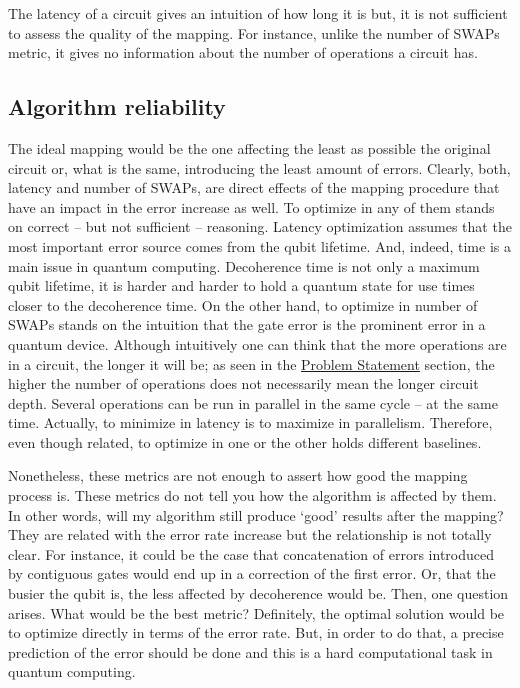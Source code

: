 The latency of a circuit gives an intuition of how long it is but, it is not sufficient to assess the quality of the mapping. For instance, unlike the number of SWAPs metric, it gives no information about the number of operations a circuit has.

\subsection{Algorithm reliability}
\label{sec:org4a19018}

The ideal mapping would be the one affecting the least as possible the original circuit or, what is the same, introducing the least amount of errors.
Clearly, both, latency and number of SWAPs, are direct effects of the mapping procedure that have an impact in the error increase as well.
To optimize in any of them stands on correct -- but not sufficient -- reasoning.
Latency optimization assumes that the most important error source comes from the qubit lifetime.
And, indeed, time is a main issue in quantum computing.
Decoherence time is not only a maximum qubit lifetime, it is harder and harder to hold a quantum state for use times closer to the decoherence time.
On the other hand, to optimize in number of SWAPs stands on the intuition that the gate error is the prominent error in a quantum device.
Although intuitively one can think that the more operations are in a circuit, the longer it will be; as seen in the \href{chapter-1.org}{Problem Statement} section, the higher the number of operations does not necessarily mean the longer circuit depth.
Several operations can be run in parallel in the same cycle -- at the same time.
Actually, to minimize in latency is to maximize in parallelism.
Therefore, even though related, to optimize in one or the other holds different baselines.

Nonetheless, these metrics are not enough to assert how good the mapping process is.
These metrics do not tell you how the algorithm is affected by them.
In other words, will my algorithm still produce `good' results after the mapping?
They are related with the error rate increase but the relationship is not totally clear.
For instance, it could be the case that concatenation of errors introduced by contiguous gates would end up in a correction of the first error.
Or, that the busier the qubit is, the less affected by decoherence would be.
Then, one question arises.
What would be the best metric?
Definitely, the optimal solution would be to optimize directly in terms of the error rate.
But, in order to do that, a precise prediction of the error should be done and this is a hard computational task in quantum computing.


